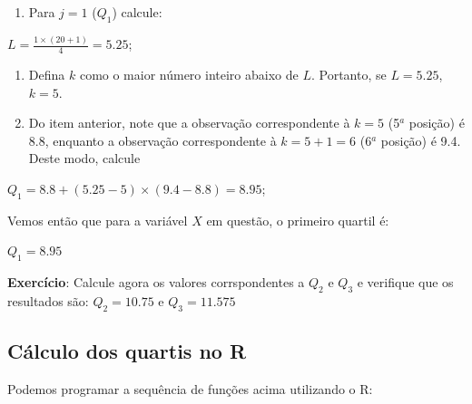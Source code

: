 \documentclass[
]{book}
\providecommand{\tightlist}{%
  \setlength{\itemsep}{0pt}\setlength{\parskip}{0pt}}
\begin{document}
\begin{enumerate}
\def\labelenumi{\arabic{enumi}.}
\setcounter{enumi}{1}
\tightlist
\item
  Para \(j = 1\) (\(Q_1\)) calcule:
\end{enumerate}

\(L = \frac{1 \times (20+1)}{4} = 5.25\);

\begin{enumerate}
\def\labelenumi{\arabic{enumi}.}
\setcounter{enumi}{2}
\item
  Defina \(k\) como o maior número inteiro abaixo de \(L\). Portanto, se \(L = 5.25\), \(k = 5\).
\item
  Do item anterior, note que a observação correspondente à \(k = 5\) (5\(^a\) posição) é 8.8, enquanto a observação correspondente à \(k = 5 + 1 = 6\) (6\(^a\) posição) é 9.4. Deste modo, calcule
\end{enumerate}

\(Q_1 = 8.8 + (5.25 - 5) \times (9.4-8.8) = 8.95\);

Vemos então que para a variável \(X\) em questão, o primeiro quartil é:

\(Q_1 = 8.95\)

\textbf{Exercício}: Calcule agora os valores corrspondentes a \(Q_2\) e \(Q_3\) e verifique que os resultados são: \(Q_2 = 10.75\) e \(Q_3 = 11.575\)

\hypertarget{cuxe1lculo-dos-quartis-no-r}{%
\subsection{Cálculo dos quartis no R}\label{cuxe1lculo-dos-quartis-no-r}}

Podemos programar a sequência de funções acima utilizando o R:
\end{document}
